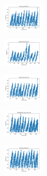 \begin{figure}[H]    
    \centering
    \begin{subfigure}
        \centering
        \includegraphics[width=0.234\textwidth]{img/bmb/iris_set_const_10_949004259_time.png}
    \end{subfigure}
    \hfill
    \begin{subfigure}
        \centering
        \includegraphics[width=0.234\textwidth]{img/bmb/ecoli_set_const_10_949004259_time.png}
    \end{subfigure}
    \hfill
    \begin{subfigure}
        \centering
        \includegraphics[width=0.234\textwidth]{img/bmb/rand_set_const_10_949004259_time.png}
    \end{subfigure}
    \hfill
    \begin{subfigure}
        \centering
        \includegraphics[width=0.234\textwidth]{img/bmb/newthyroid_set_const_10_949004259_time.png}
    \end{subfigure}
    \hfill
    \begin{subfigure}
        \centering
        \includegraphics[width=0.234\textwidth]{img/bmb/iris_set_const_10_589741062_time.png}
    \end{subfigure}
    \hfill
    \begin{subfigure}

\end{subfigure}
\end{figure}
